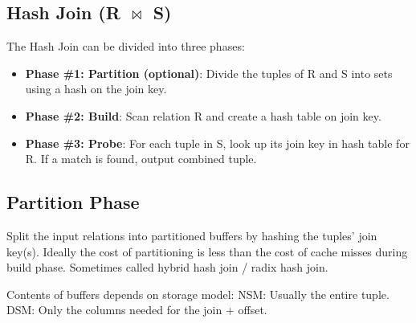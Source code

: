 \documentclass[11pt]{article}
\begin{document}
\subsection*{Hash Join (R $\bowtie$ S)}
The Hash Join can be divided into three phases\cite{Schuh2016}:
\begin{itemize}
    \item \textbf{Phase \#1: Partition (optional)}:
    Divide the tuples of R and S into sets using a hash on the join key.
    
    \item \textbf{Phase \#2: Build}:
    Scan relation R and create a hash table on join key.
    
    \item \textbf{Phase \#3: Probe}:
    For each tuple in S, look up its join key in hash table for R. 
    If a match is found, output combined tuple.
\end{itemize}
    
\subsection*{Partition Phase}
Split the input relations into partitioned buffers by hashing the tuples’ join key(s). Ideally the cost of partitioning is less than the cost of cache misses during build phase. Sometimes called hybrid hash join / radix hash join.

Contents of buffers depends on storage model: NSM: Usually the entire tuple. DSM: Only the columns needed for the join + offset.
\end{document}
